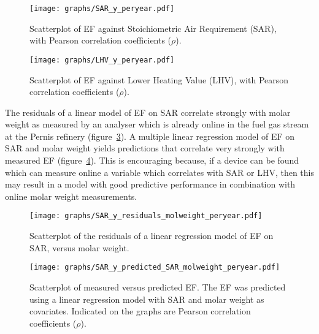 \begin{figure}[h]
	\centering
	\texttt{[image: graphs/SAR\_y\_peryear.pdf]}
	\caption{Scatterplot of EF against Stoichiometric Air Requirement (SAR), with Pearson correlation coefficients ($\rho$). }
	\label{fig:SAR_y_peryear}
\end{figure}


\begin{figure}[h]
	\centering
	\texttt{[image: graphs/LHV\_y\_peryear.pdf]}
	\caption{Scatterplot of EF against Lower Heating Value (LHV), with Pearson correlation coefficients ($\rho$). }
	\label{fig:LHV_y_peryear}
\end{figure}

The residuals of a linear model of EF on SAR correlate strongly with molar weight as measured by an analyser which is already online in the fuel gas stream at the Pernis refinery (figure~\ref{fig:SAR_y_residuals_molweight_peryear}). A multiple linear regression model of EF on SAR and molar weight yields predictions that correlate very strongly with measured EF (figure~\ref{fig:SAR_y_predicted_SAR_molweight_peryear}). This is encouraging because, if a device can be found which can measure online a variable which correlates with SAR or LHV, then this may result in a model with good predictive performance in combination with online molar weight measurements.

\begin{figure}[h]
	\centering
	\texttt{[image: graphs/SAR\_y\_residuals\_molweight\_peryear.pdf]}
	\caption{ Scatterplot of the residuals of a linear regression model of EF on SAR, versus molar weight. }
	\label{fig:SAR_y_residuals_molweight_peryear}
\end{figure}

\begin{figure}[h]
	\centering
	\texttt{[image: graphs/SAR\_y\_predicted\_SAR\_molweight\_peryear.pdf]}
	\caption{Scatterplot of measured versus predicted EF. The EF was predicted using a linear regression model with SAR and molar weight as covariates. Indicated on the graphs are Pearson correlation coefficients ($\rho$). }
	\label{fig:SAR_y_predicted_SAR_molweight_peryear}
\end{figure}

